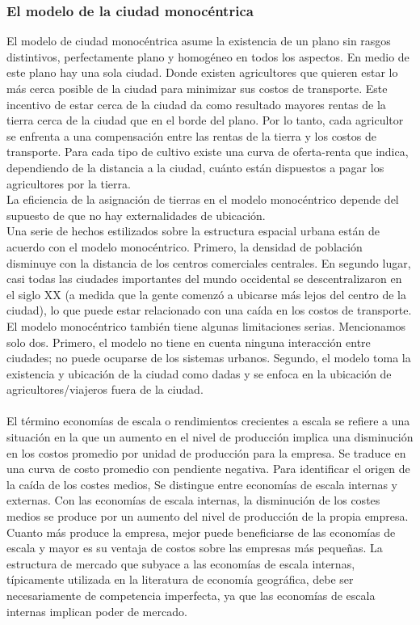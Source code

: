 \subsubsection{El modelo de la ciudad monocéntrica}
El modelo de ciudad monocéntrica asume la existencia de un plano sin rasgos distintivos, perfectamente plano y homogéneo en todos los aspectos. En medio de este plano hay una sola ciudad. Donde existen  agricultores que quieren estar lo más cerca posible de la ciudad para minimizar sus costos de transporte. Este incentivo de estar cerca de la ciudad da como resultado mayores rentas de la tierra cerca de la ciudad que en el borde del plano. Por lo tanto, cada agricultor se enfrenta a una compensación entre las rentas de la tierra y los costos de transporte. Para cada tipo de cultivo existe una curva de oferta-renta que indica, dependiendo de la distancia a la ciudad, cuánto están dispuestos a pagar los agricultores por la tierra.\\
La eficiencia de la asignación de tierras en el modelo monocéntrico depende del supuesto de que no hay externalidades de ubicación.\\
Una serie de hechos estilizados sobre la estructura espacial urbana están de acuerdo con el modelo monocéntrico. Primero, la densidad de población disminuye con la distancia de los centros comerciales centrales. En segundo lugar, casi todas las ciudades importantes del mundo occidental se descentralizaron en el siglo XX (a medida que la gente comenzó a ubicarse más lejos del centro de la ciudad), lo que puede estar relacionado con una caída en los costos de transporte. El modelo monocéntrico también tiene algunas limitaciones serias. Mencionamos solo dos. Primero, el modelo no tiene en cuenta ninguna interacción entre ciudades; no puede ocuparse de los sistemas urbanos. Segundo, el modelo toma la existencia y ubicación de la ciudad como dadas y se enfoca en la ubicación de agricultores/viajeros fuera de la ciudad. \\\\
El término economías de escala o rendimientos crecientes a escala se refiere a una situación en la que un aumento en el nivel de producción implica una disminución en los costos promedio por unidad de producción para la empresa. Se traduce en una curva de costo promedio con pendiente negativa. Para identificar el origen de la caída de los costes medios, Se distingue entre economías de escala internas y externas. Con las economías de escala internas, la disminución de los costes medios se produce por un aumento del nivel de producción de la propia empresa. Cuanto más produce la empresa, mejor puede beneficiarse de las economías de escala y mayor es su ventaja de costos sobre las empresas más pequeñas. La estructura de mercado que subyace a las economías de escala internas, típicamente utilizada en la literatura de economía geográfica, debe ser necesariamente de competencia imperfecta, ya que las economías de escala internas implican poder de mercado.\\
